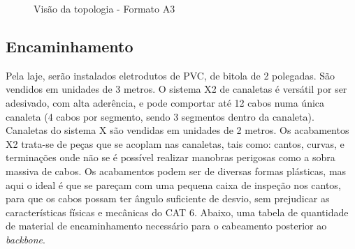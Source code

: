 \documentclass[	DIV=calc,%
							paper=a4,%
							fontsize=12pt,%
							onecolumn]{scrartcl}	 					%
\begin{document}
\begin{figure}
	\noindent{}
	\caption{Visão da topologia - Formato A3}
	\label{fig1}
\end{figure}

\clearpage
{}
\recalctypearea


\subsection{Encaminhamento}

Pela laje, serão instalados eletrodutos de PVC, de bitola de 2 polegadas. São vendidos em unidades de 3 metros. O sistema X2 de canaletas é versátil por ser adesivado, com alta aderência, e pode comportar até 12 cabos numa única canaleta (4 cabos por segmento, sendo 3 segmentos dentro da canaleta). Canaletas do sistema X são vendidas em unidades de 2 metros. Os acabamentos X2 trata-se de peças que se acoplam nas canaletas, tais como: cantos, curvas, e terminações onde não se é possível realizar manobras perigosas como a sobra massiva de cabos. Os acabamentos podem ser de diversas formas plásticas, mas aqui o ideal é que se pareçam com uma pequena caixa de inspeção nos cantos, para que os cabos possam ter ângulo suficiente de desvio, sem prejudicar as características físicas e mecânicas do CAT 6. Abaixo, uma tabela de quantidade de material de encaminhamento necessário para o cabeamento posterior ao \textit{backbone}.


\end{document}
